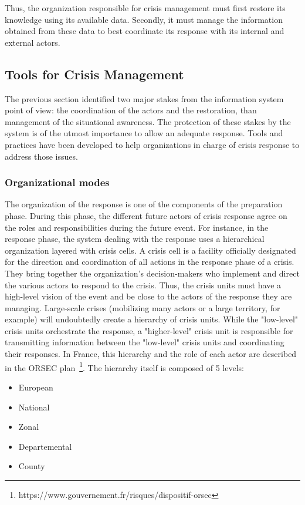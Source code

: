 Thus, the organization responsible for crisis management must first restore its knowledge using its available data.
Secondly, it must manage the information obtained from these data to best coordinate its response with its internal and external actors.

\subsection{Tools for Crisis Management}
The previous section identified two major stakes from the information system point of view: the coordination of the actors and the restoration, than management of the situational awareness.
The protection of these stakes by the system is of the utmost importance to allow an adequate response.
Tools and practices have been developed to help organizations in charge of crisis response to address those issues.

\subsubsection{Organizational modes}
The organization of the response is one of the components of the preparation phase.
During this phase, the different future actors of crisis response agree on the roles and responsibilities during the future event.
For instance, in the response phase, the system dealing with the response uses a hierarchical organization layered with crisis cells.
A crisis cell is a facility officially designated for the direction and coordination of all actions in the response phase of a crisis.
They bring together the organization's decision-makers who implement and direct the various actors to respond to the crisis.
Thus, the crisis units must have a high-level vision of the event and be close to the actors of the response they are managing.
Large-scale crises (mobilizing many actors or a large territory, for example) will undoubtedly create a hierarchy of crisis units.
While the "low-level" crisis units orchestrate the response, a "higher-level" crisis unit is responsible for transmitting information between the "low-level" crisis units and coordinating their responses.
In France, this hierarchy and the role of each actor are described in the ORSEC plan~\footnote{https://www.gouvernement.fr/risques/dispositif-orsec}.
The hierarchy itself is composed of 5 levels:

\begin{itemize}
    \item European
    \item National
    \item Zonal
    \item Departemental
    \item County
\end{itemize}

